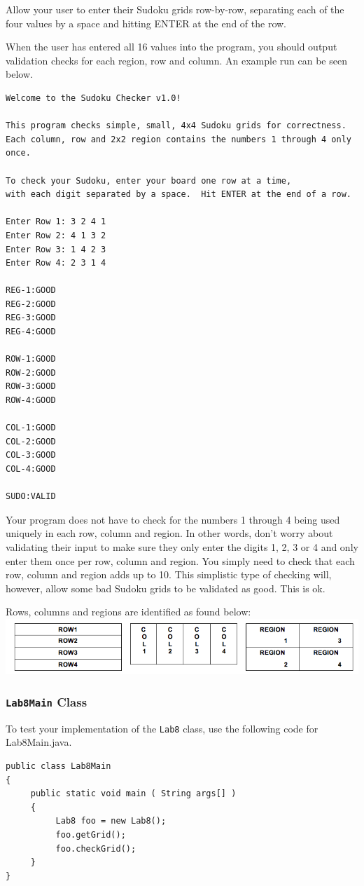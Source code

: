 \noindent Allow your user to enter their Sudoku grids row-by-row, separating each of the four values by a space and hitting ENTER at the end of the row.

\noindent When the user has entered all 16 values into the program, you should output validation checks for each region, row and column.  An example run can be seen below.
\begin{verbatim}
Welcome to the Sudoku Checker v1.0!

This program checks simple, small, 4x4 Sudoku grids for correctness. 
Each column, row and 2x2 region contains the numbers 1 through 4 only once.

To check your Sudoku, enter your board one row at a time, 
with each digit separated by a space.  Hit ENTER at the end of a row.

Enter Row 1: 3 2 4 1
Enter Row 2: 4 1 3 2
Enter Row 3: 1 4 2 3
Enter Row 4: 2 3 1 4

REG-1:GOOD
REG-2:GOOD
REG-3:GOOD
REG-4:GOOD

ROW-1:GOOD
ROW-2:GOOD
ROW-3:GOOD
ROW-4:GOOD

COL-1:GOOD
COL-2:GOOD
COL-3:GOOD
COL-4:GOOD

SUDO:VALID
\end{verbatim}

\noindent Your program does not have to check for the numbers 1 through 4 being used uniquely in each row, column and region.  In other words, don't worry about validating their input to make sure they only enter the digits 1, 2, 3 or 4 and only enter them once per row, column and region.  
You simply need to check that each row, column and region adds up to 10. This simplistic type of checking will, however, allow some bad Sudoku grids to be validated as good. This is ok. 

\noindent Rows, columns and regions are identified as found below:\\
\includegraphics[scale=0.5]{sud}

\subsubsection*{{\tt Lab8Main} Class}

To test your implementation of the {\tt Lab8} class, use the following code for Lab8Main.java.
\begin{verbatim}
public class Lab8Main
{
     public static void main ( String args[] )
     {
          Lab8 foo = new Lab8();
          foo.getGrid();
          foo.checkGrid();
     }
}
\end{verbatim}

